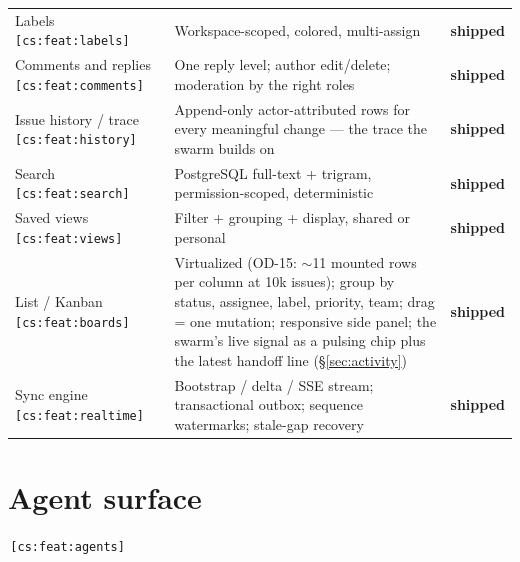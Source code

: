\documentclass[11pt,a4paper]{report}
\newcommand{\cs}[1]{\,\texttt{\scriptsize[cs:#1]}\label{cs:#1}}
\newcommand{\shipped}{\textbf{\textcolor{green!45!black}{shipped}}}
\begin{document}
\begin{center}
\begin{longtable}{@{}p{}p{}l@{}}
Labels\cs{feat:labels} & Workspace-scoped, colored, multi-assign & \shipped\\
Comments and replies\cs{feat:comments} & One reply level; author
  edit/delete; moderation by the right roles & \shipped\\
Issue history / trace\cs{feat:history} & Append-only actor-attributed
  rows for every meaningful change --- the trace the swarm builds on &
  \shipped\\
Search\cs{feat:search} & PostgreSQL full-text + trigram,
  permission-scoped, deterministic & \shipped\\
Saved views\cs{feat:views} & Filter + grouping + display, shared or
  personal & \shipped\\
List / Kanban\cs{feat:boards} & Virtualized (OD-15: $\sim$11 mounted rows
  per column at 10k issues); group by status, assignee, label, priority,
  team; drag = one mutation; responsive side panel; the swarm's live signal
  as a pulsing chip plus the latest handoff line (\S\ref{sec:activity}) &
  \shipped\\
Sync engine\cs{feat:realtime} & Bootstrap / delta / SSE stream;
  transactional outbox; sequence watermarks; stale-gap recovery &
  \shipped\\
\bottomrule
\end{longtable}
\end{center}

\section{Agent surface}
\cs{feat:agents}
\end{document}
